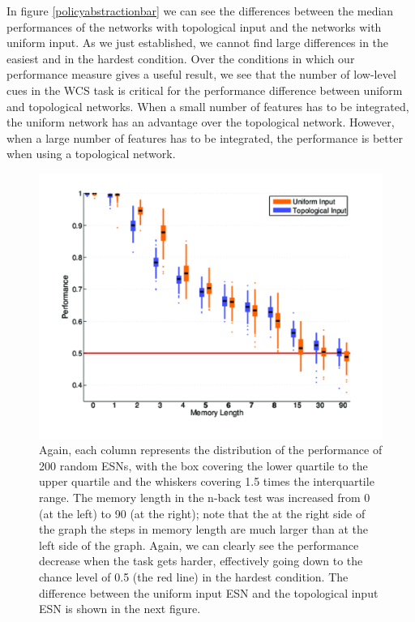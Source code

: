 \documentclass[10pt,a4paper]{report}
\begin{document}
In figure \ref{policyabstractionbar} we can see the differences between the median performances of the networks with topological input and the networks with uniform input. As we just established, we cannot find large differences in the easiest and in the hardest condition. Over the conditions in which our performance measure gives a useful result, we see that the number of low-level cues in the WCS task is critical for the performance difference between uniform and topological networks. When a small number of features has to be integrated, the uniform network has an advantage over the topological network. However, when a large number of features has to be integrated, the performance is better when using a topological network.


\begin{figure}[bthp]
\includegraphics[width=\textwidth]{figures/memboxchance.png}
\caption{Again, each column represents the distribution of the performance of 200 random ESNs, with the box covering the lower quartile to the upper quartile and the whiskers covering 1.5 times the interquartile range. The memory length in the n-back test was increased from 0 (at the left) to 90 (at the right); note that the at the right side of the graph the steps in memory length are much larger than at the left side of the graph. Again, we can clearly see the performance decrease when the task gets harder, effectively going down to the chance level of 0.5 (the red line) in the hardest condition. The difference between the uniform input ESN and the topological input ESN is shown in the next figure. }
\label{temporalabstraction}
\end{figure}
\end{document}
